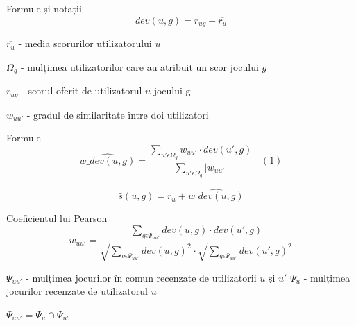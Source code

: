 \documentclass{beamer}
\DeclareMathOperator*{\argmax}{argmax}
\begin{document}
\begin{frame}{Formule și notații}
    \[ dev(u,g) = r_{ug} - \overline{r_{u}} \]
    
    \( \overline{r_{u}}\) - media scorurilor utilizatorului \( u \)
    
    \( \Omega_{g}\) - mulțimea utilizatorilor care au atribuit un scor jocului \( g \)
    
    \( r_{ug} \) - scorul oferit de utilizatorul \( u \) jocului g
    
    \( w_{uu'}\) - gradul de similaritate între doi utilizatori
    
\end{frame}

\begin{frame}{Formule}
    \[ \hat{w\_dev(u,g)} = \dfrac{ \sum\limits_{u' \epsilon \Omega_{g} } w_{uu'} \cdot dev(u', g) }{\sum\limits_{u' \epsilon \Omega_{g}} |w_{uu'}|} \;\;\; (1) \]
    
    \[  \hat{s}(u,g) = \overline{r_u} + \hat{w\_dev(u,g)} \]
\end{frame}

\begin{frame}{Coeficientul lui Pearson}
\[ w_{uu'} = \dfrac{ \sum\limits_{g \epsilon \Psi_{uu'} } dev(u, g) \cdot dev(u', g) }{
\sqrt{\sum\limits_{g \epsilon \Psi_{uu'} } dev(u, g)^2} \cdot \sqrt{\sum\limits_{g \epsilon \Psi_{uu'} } dev(u', g)^2} }\]

\( \Psi_{uu'}\) - mulțimea jocurilor în comun recenzate de utilizatorii \( u \) și \( u' \)
\( \Psi_{u}\) - mulțimea jocurilor recenzate de utilizatorul \( u \)

\( \Psi_{uu'} = \Psi_{u} \cap \Psi_{u'} \) 

    
\end{frame}

\end{document}
